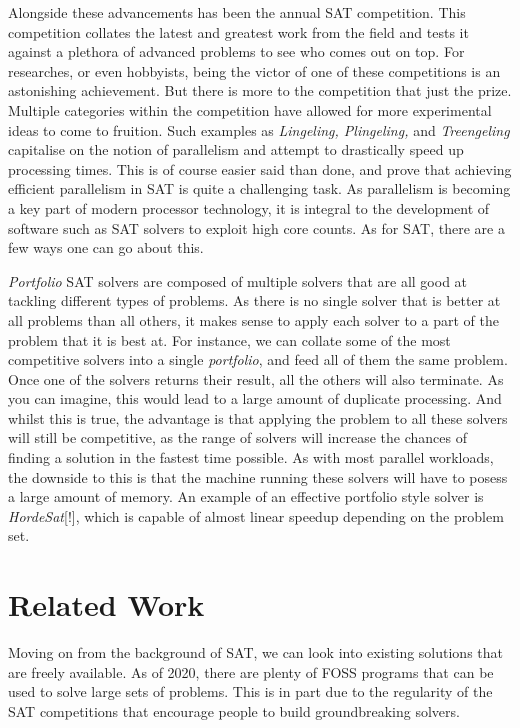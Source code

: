 \documentclass{article}
\begin{document}
Alongside these advancements has been the annual SAT competition. This competition collates the
latest and greatest work from the field and tests it against a plethora of advanced problems to see
who comes out on top. For researches, or even hobbyists, being the victor of one of these
competitions is an astonishing achievement. But there is more to the competition that just the
prize. Multiple categories within the competition have allowed for more experimental ideas to come
to fruition. Such examples as \textit{Lingeling, Plingeling,} and \textit{Treengeling} capitalise on
the notion of parallelism and attempt to drastically speed up processing times. This is of course
easier said than done, and prove that achieving efficient parallelism in SAT is quite a challenging
task. As parallelism is becoming a key part of modern processor technology, it is integral to the
development of software such as SAT solvers to exploit high core counts. As for SAT, there are a few
ways one can go about this.

\textit{Portfolio} SAT solvers are composed of multiple solvers that are all good at tackling
different types of problems. As there is no single solver that is better at all problems than all
others, it makes sense to apply each solver to a part of the problem that it is best at. For
instance, we can collate some of the most competitive solvers into a single \textit{portfolio}, and
feed all of them the same problem. Once one of the solvers returns their result, all the others will
also terminate. As you can imagine, this would lead to a large amount of duplicate processing. And
whilst this is true, the advantage is that applying the problem to all these solvers will still be
competitive, as the range of solvers will increase the chances of finding a solution in the fastest
time possible. As with most parallel workloads, the downside to this is that the machine running
these solvers will have to posess a large amount of memory. An example of an effective portfolio
style solver is \textit{HordeSat}[!], which is capable of almost linear speedup depending on the
problem set. %

\section{Related Work}
Moving on from the background of SAT, we can look into existing solutions that are freely available.
As of 2020, there are plenty of FOSS programs that can be used to solve large sets of problems. This
is in part due to the regularity of the SAT competitions that encourage people to build
groundbreaking solvers.
\end{document}
